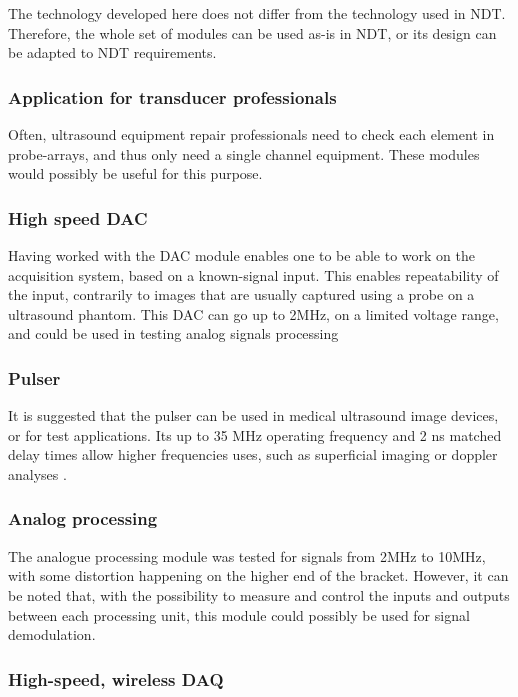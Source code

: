 \documentclass[letterpaper, 10 pt, conference]{ieeeconf} %
\begin{document}
The technology developed here does not differ from the technology used in NDT. Therefore, the whole set of modules can be used as-is in NDT, or its design can be adapted to NDT requirements.

\subsubsection{Application for transducer professionals} 

Often, ultrasound equipment repair professionals need to check each element in probe-arrays, and thus only need a single channel equipment. These modules would possibly be useful for this purpose. 

\subsubsection{High speed DAC}

Having worked with the DAC module enables one to be able to work on the acquisition system, based on a known-signal input. This enables repeatability of the input, contrarily to images that are usually captured using a probe on a ultrasound phantom. This DAC can go up to 2MHz, on a limited voltage range, and could be used in testing analog signals processing

\subsubsection{Pulser}

It is suggested that the pulser can be used in medical ultrasound image devices, or for test applications. Its up to 35 MHz operating frequency and 2 ns matched delay times allow higher frequencies uses, such as superficial imaging or doppler analyses \cite{c1}.

\subsubsection{Analog processing}

The analogue processing module was tested for signals from 2MHz to 10MHz, with some distortion happening on the higher end of the bracket. However, it can be noted that, with the possibility to measure and control the inputs and outputs between each processing unit, this module could possibly be used for signal demodulation.

\subsubsection{High-speed, wireless DAQ}
\end{document}
